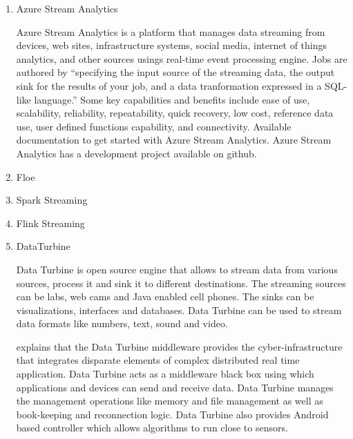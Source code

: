 \begin{enumerate}
\item {} 
Azure Stream Analytics

Azure Stream Analytics is a platform that manages data streaming
from devices, web sites, infrastructure systems, social media,
internet of things analytics, and other sources usings real-time
event processing engine. \label{\detokenize{i524/technologies:id273}}{\hyperref[\detokenize{i524/technologies:www-azurestreamanalytics}]{\sphinxcrossref{{[}228{]}}}} Jobs
are authored by ``specifying the input source of the streaming
data, the output sink for the results of your job, and a data
tranformation expressed in a SQL-like language.''  Some key
capabilities and benefits include ease of use, scalability,
reliability, repeatability, quick recovery, low cost, reference
data use, user defined functions capability, and
connectivity. \label{\detokenize{i524/technologies:id274}}{\hyperref[\detokenize{i524/technologies:www-docs-microsoft}]{\sphinxcrossref{{[}229{]}}}} Available documentation
to get started with Azure Stream
Analytics. \label{\detokenize{i524/technologies:id275}}{\hyperref[\detokenize{i524/technologies:www-github-azure}]{\sphinxcrossref{{[}230{]}}}} Azure Stream Analytics has a
development project available on github.

\item {} 
Floe

\item {} 
Spark Streaming

\item {} 
Flink Streaming

\item {} 
DataTurbine

Data Turbine \label{\detokenize{i524/technologies:id276}}{\hyperref[\detokenize{i524/technologies:www-data-turbine}]{\sphinxcrossref{{[}231{]}}}} is open source engine that
allows to stream data from various sources, process it and sink
it to different destinations. The streaming sources can be labs,
web cams and Java enabled cell phones. The sinks can be
visualizations, interfaces and databases.  Data Turbine can be
used to stream data formats like numbers, text, sound and video.

\label{\detokenize{i524/technologies:id277}}{\hyperref[\detokenize{i524/technologies:osdt-ecologicalsociety}]{\sphinxcrossref{{[}232{]}}}} explains that the Data Turbine
middleware provides the cyber-infrastructure that integrates
disparate elements of complex distributed real time
application. Data Turbine acts as a middleware black box using
which applications and devices can send and receive data. Data
Turbine manages the management operations like memory and file
management as well as book-keeping and reconnection logic.  Data
Turbine also provides Android based controller which allows
algorithms to run close to sensors.

\end{enumerate}


